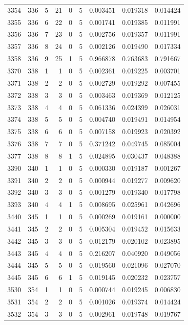 \begin{longtable}{rrrrrrrrr}
3354 & 336 & 5 & 21 & 0 & 5 & 0.003451 & 0.019318 & 0.014424 \\
3355 & 336 & 6 & 22 & 0 & 5 & 0.001741 & 0.019385 & 0.011991 \\
3356 & 336 & 7 & 23 & 0 & 5 & 0.002756 & 0.019357 & 0.011991 \\
3357 & 336 & 8 & 24 & 0 & 5 & 0.002126 & 0.019490 & 0.017334 \\
3358 & 336 & 9 & 25 & 1 & 5 & 0.966878 & 0.763683 & 0.791667 \\
3370 & 338 & 1 & 1 & 0 & 5 & 0.002361 & 0.019225 & 0.003701 \\
3371 & 338 & 2 & 2 & 0 & 5 & 0.002729 & 0.019292 & 0.007455 \\
3372 & 338 & 3 & 3 & 0 & 5 & 0.003463 & 0.019369 & 0.012125 \\
3373 & 338 & 4 & 4 & 0 & 5 & 0.061336 & 0.024399 & 0.026031 \\
3374 & 338 & 5 & 5 & 0 & 5 & 0.004740 & 0.019491 & 0.014954 \\
3375 & 338 & 6 & 6 & 0 & 5 & 0.007158 & 0.019923 & 0.020392 \\
3376 & 338 & 7 & 7 & 0 & 5 & 0.371242 & 0.049745 & 0.085004 \\
3377 & 338 & 8 & 8 & 1 & 5 & 0.024895 & 0.030437 & 0.048388 \\
3390 & 340 & 1 & 1 & 0 & 5 & 0.000330 & 0.019187 & 0.001267 \\
3391 & 340 & 2 & 2 & 0 & 5 & 0.000944 & 0.019277 & 0.009620 \\
3392 & 340 & 3 & 3 & 0 & 5 & 0.001279 & 0.019340 & 0.017798 \\
3393 & 340 & 4 & 4 & 1 & 5 & 0.008695 & 0.025961 & 0.042696 \\
3440 & 345 & 1 & 1 & 0 & 5 & 0.000269 & 0.019161 & 0.000000 \\
3441 & 345 & 2 & 2 & 0 & 5 & 0.005304 & 0.019452 & 0.015633 \\
3442 & 345 & 3 & 3 & 0 & 5 & 0.012179 & 0.020102 & 0.023895 \\
3443 & 345 & 4 & 4 & 0 & 5 & 0.216207 & 0.040920 & 0.049056 \\
3444 & 345 & 5 & 5 & 0 & 5 & 0.019560 & 0.021096 & 0.027070 \\
3445 & 345 & 6 & 6 & 1 & 5 & 0.019145 & 0.020232 & 0.023757 \\
3530 & 354 & 1 & 1 & 0 & 5 & 0.000744 & 0.019245 & 0.006830 \\
3531 & 354 & 2 & 2 & 0 & 5 & 0.001026 & 0.019374 & 0.014424 \\
3532 & 354 & 3 & 3 & 0 & 5 & 0.002961 & 0.019748 & 0.019767 \\

\end{longtable}
